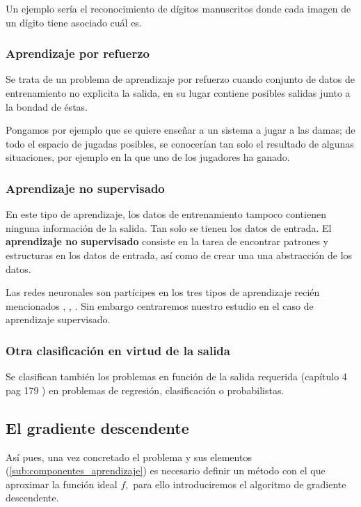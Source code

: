 Un ejemplo sería el reconocimiento de dígitos  manuscritos donde cada imagen de un dígito tiene asociado cuál es. 


\subsubsection{Aprendizaje por refuerzo}  
Se trata de un problema de aprendizaje por refuerzo 
cuando conjunto de datos de entrenamiento no explicita la salida, en su lugar contiene posibles salidas junto a la bondad de éstas. 

Pongamos por ejemplo que se quiere enseñar a un sistema a jugar
a las damas; de todo el espacio de jugadas posibles, se conocerían tan solo el resultado de algunas situaciones, por ejemplo en la que uno de los jugadores ha ganado.  

\subsubsection{Aprendizaje no supervisado}  

En este tipo de aprendizaje, los datos de entrenamiento tampoco contienen ninguna información de la salida.
 Tan solo se tienen los datos de entrada. El \textbf{aprendizaje no supervisado} 
 consiste en la tarea de encontrar patrones y estructuras en los datos de entrada, 
 así como de crear una una abstracción de los datos.  


Las redes neuronales son partícipes en los tres tipos de aprendizaje 
recién mencionados
\cite{8612259}, \cite{DBLP:journals/corr/BakerGNR16}, \cite{10.5555/2955491.2955578}. Sin embargo centraremos nuestro estudio en el caso 
de aprendizaje supervisado. 

\subsubsection*{Otra clasificación en virtud de la salida}

Se clasifican también los problemas en función de la salida requerida (capítulo 4 pag 179
\cite{BishopPaterRecognition}) en problemas de regresión, clasificación o probabilistas. 

\subsection{El gradiente descendente} 

Así pues, una vez concretado el problema y sus elementos 
(\ref{sub:componentes_aprendizaje}) es necesario definir un método con el que aproximar la función ideal $f,$ para ello introduciremos el algoritmo de gradiente descendente.  


